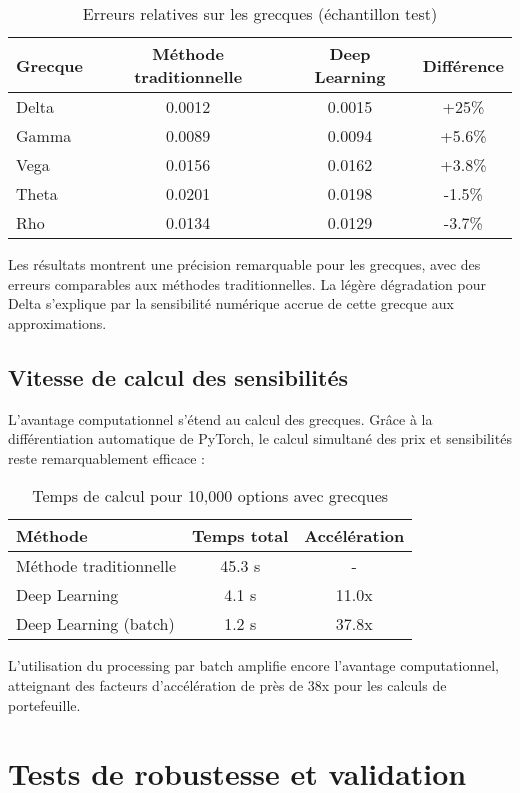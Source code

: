 \begin{table}[H]
\centering
\caption{Erreurs relatives sur les grecques (échantillon test)}
\begin{tabular}{@{}lccc@{}}
\toprule
\textbf{Grecque} & \textbf{Méthode traditionnelle} & \textbf{Deep Learning} & \textbf{Différence} \\
\midrule
Delta & 0.0012 & 0.0015 & +25\% \\
Gamma & 0.0089 & 0.0094 & +5.6\% \\
Vega & 0.0156 & 0.0162 & +3.8\% \\
Theta & 0.0201 & 0.0198 & -1.5\% \\
Rho & 0.0134 & 0.0129 & -3.7\% \\
\bottomrule
\end{tabular}
\end{table}

Les résultats montrent une précision remarquable pour les grecques, avec des erreurs comparables aux méthodes traditionnelles. La légère dégradation pour Delta s'explique par la sensibilité numérique accrue de cette grecque aux approximations.

\subsection{Vitesse de calcul des sensibilités}

L'avantage computationnel s'étend au calcul des grecques. Grâce à la différentiation automatique de PyTorch, le calcul simultané des prix et sensibilités reste remarquablement efficace :

\begin{table}[H]
\centering
\caption{Temps de calcul pour 10,000 options avec grecques}
\begin{tabular}{@{}lcc@{}}
\toprule
\textbf{Méthode} & \textbf{Temps total} & \textbf{Accélération} \\
\midrule
Méthode traditionnelle & 45.3 s & - \\
Deep Learning & 4.1 s & 11.0x \\
Deep Learning (batch) & 1.2 s & 37.8x \\
\bottomrule
\end{tabular}
\end{table}

L'utilisation du processing par batch amplifie encore l'avantage computationnel, atteignant des facteurs d'accélération de près de 38x pour les calculs de portefeuille.

\section{Tests de robustesse et validation}

